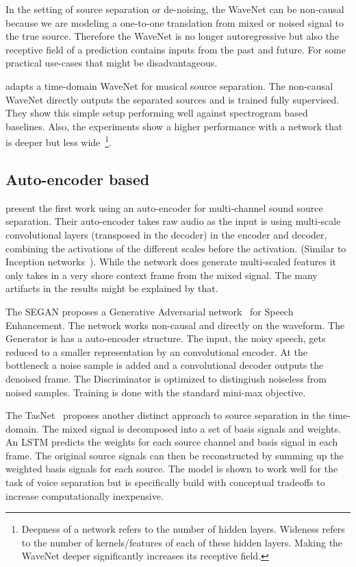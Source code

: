 In the setting of source separation or de-noising, the WaveNet can be non-causal because we are modeling a one-to-one translation from mixed or noised signal to the true source. Therefore the WaveNet is no longer autoregressive but also the receptive field of a  prediction contains inputs from the past and future. For some practical use-cases that might be disadvantageous.

\textcite{lluisEndtoend2019} adapts a time-domain WaveNet for musical source separation. The non-causal WaveNet directly outputs the separated sources and is trained fully supervised. They show this simple setup performing well against spectrogram based baselines. Also, the experiments show a higher performance with a network that is deeper but less wide~\footnote{Deepness of a network refers to the number of hidden layers. Wideness refers to the number of kernels/features of each of these hidden layers. Making the WaveNet deeper significantly increases its receptive field.}.

\subsection{Auto-encoder based}
\textcite{graisRaw2018} present the first work using an auto-encoder for multi-channel sound source separation. Their auto-encoder takes raw audio as the input is using multi-scale convolutional layers (transposed in the decoder) in the encoder and decoder, combining the activations of the different scales before the activation. (Similar to Inception networks~\cite{szegedyGoing2014}). While the network does generate multi-scaled features it only takes in a very shore context frame from the mixed signal. The many artifacts in the results might be explained by that.

The SEGAN\cite{pascualSEGAN2017} proposes a Generative Adversarial network~\cite{goodfellowGenerative2014} for Speech Enhancement. The network works non-causal and directly on the waveform. The Generator is has a auto-encoder structure. The input, the noisy speech, gets reduced to a smaller representation by an convolutional encoder. At the bottleneck a noise sample is added and a convolutional decoder outputs the denoised frame. The Discriminator is optimized to distingiush noiseless from noised samples. Training is done with the standard mini-max objective.

The TasNet~\cite{luoTasNet2018} proposes another distinct approach to source separation in the time-domain. The mixed signal is decomposed into a set of basis signals and weights. An LSTM predicts the weights for each source channel and basis signal in each frame. The original source signals can then be reconstructed by summing up the weighted basis signals for each source. The model is shown to work well for the task of voice separation but is specifically build with conceptual tradeoffs to increase computationally inexpensive.
